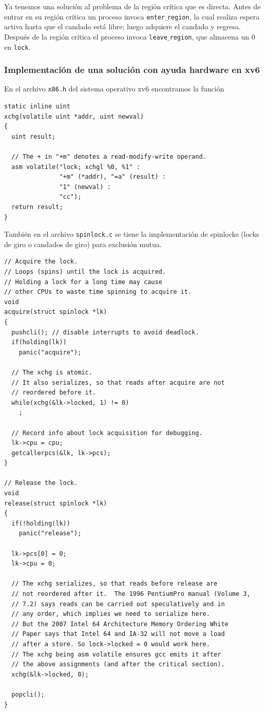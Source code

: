 \documentclass{article}
\begin{document}
Ya tenemos una soluci\'on al problema de la regi\'on cr\'itica que es 
directa. Antes de entrar en su regi\'on cr\'itica un proceso invoca 
{\tt enter$\_$region}, la cual realiza espera activa hasta que el candado 
est\'a libre; luego adquiere el candado y regresa. Despu\'es de la regi\'on 
cr\'itica el proceso invoca {\tt leave$\_$region}, que almacena un 0 en 
{\tt lock}.

\subsubsection*{Implementaci\'on de una soluci\'on con ayuda hardware en xv6}
En el archivo {\tt x86.h} del sistema operativo xv6 encontramos la funci\'on
\begin{verbatim}
static inline uint
xchg(volatile uint *addr, uint newval)
{
  uint result;
  
  // The + in "+m" denotes a read-modify-write operand.
  asm volatile("lock; xchgl %0, %1" :
               "+m" (*addr), "=a" (result) :
               "1" (newval) :
               "cc");
  return result;
}
\end{verbatim}
Tambi\'en en el archivo {\tt spinlock.c} se tiene la implementaci\'on 
de spinlocks (locks de giro o candados de giro) para exclusi\'on mutua.
\begin{verbatim}
// Acquire the lock.
// Loops (spins) until the lock is acquired.
// Holding a lock for a long time may cause
// other CPUs to waste time spinning to acquire it.
void
acquire(struct spinlock *lk)
{
  pushcli(); // disable interrupts to avoid deadlock.
  if(holding(lk))
    panic("acquire");

  // The xchg is atomic.
  // It also serializes, so that reads after acquire are not
  // reordered before it. 
  while(xchg(&lk->locked, 1) != 0)
    ;

  // Record info about lock acquisition for debugging.
  lk->cpu = cpu;
  getcallerpcs(&lk, lk->pcs);
}

// Release the lock.
void
release(struct spinlock *lk)
{
  if(!holding(lk))
    panic("release");

  lk->pcs[0] = 0;
  lk->cpu = 0;

  // The xchg serializes, so that reads before release are 
  // not reordered after it.  The 1996 PentiumPro manual (Volume 3,
  // 7.2) says reads can be carried out speculatively and in
  // any order, which implies we need to serialize here.
  // But the 2007 Intel 64 Architecture Memory Ordering White
  // Paper says that Intel 64 and IA-32 will not move a load
  // after a store. So lock->locked = 0 would work here.
  // The xchg being asm volatile ensures gcc emits it after
  // the above assignments (and after the critical section).
  xchg(&lk->locked, 0);

  popcli();
}
\end{verbatim}
\end{document}
